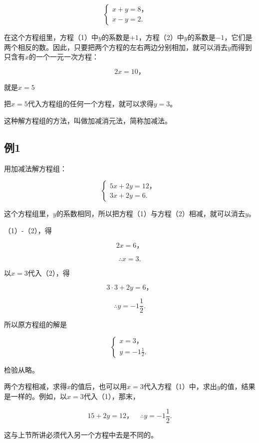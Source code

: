 \[
\left\{ \begin{array}{ll} x + y = 8\text{，} & \\ x - y = 2. & \end{array} \right. \tag{1}
\]

在这个方程组里，方程（1）中\(y\)的系数是\(+1\)，方程（2）中\(y\)的系数是\(-1\)，它们是两个相反的数。因此，只要把两个方程的左右两边分别相加，就可以消去\(y\)而得到只含有\(x\)的一个一元一次方程：

\[
2 x = 10\text{，}
\]

就是\(x = 5\)

把\(x = 5\)代入方程组的任何一个方程，就可以求得\(y = 3\)。

这种解方程组的方法，叫做加减消元法，简称加减法。

\subsection{例1}

用加减法解方程组：

\[
\left\{ \begin{array}{l} 5 x + 2 y = 12\text{，} \\ 3 x + 2 y = 6. \end{array} \right. \tag{1}
\]

这个方程组里，\(y\)的系数相同，所以把方程（1）与方程（2）相减，就可以消去\(y\)。

 （1）-（2），得

\[
2 x = 6\text{，}
\]

\[
\therefore x = 3.
\]

以\(x = 3\)代入（2），得

\[
3 \cdot 3 + 2 y = 6\text{，}
\]

\[
\therefore y = - 1 \frac{1}{2}.
\]

所以原方程组的解是

\[
\left\{ \begin{array}{l} x = 3\text{，} \\ y = - 1 \frac{1}{2}. \end{array} \right.
\]

检验从略。

两个方程相减，求得\(x\)的值后，也可以用\(x = 3\)代入方程（1）中，求出\(y\)的值，结果是一样的。例如，以\(x = 3\)代入（1），那末，

\[
15 + 2 y = 12\text{，} \quad \therefore y = - 1 \frac{1}{2}.
\]

这与上节所讲必须代入另一个方程中去是不同的。

